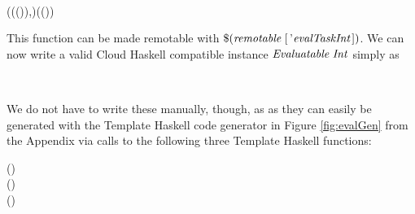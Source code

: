 \documentclass[paper=A4,twoside=true,openright,parskip=full,chapterprefix=true,headings=normal,bibliography=totoc,listof=totoc,titlepage=on,captions=tableabove,draft=false,british]{scrreprt}%
\begin{document}
\begin{hscode}\SaveRestoreHook
{}%
%
%
\>[B]{}\mathbin{::}{}\<[E]%
\\
\>[B]{}\<[5]%
\>[5]{}(\;(\;(\;)),\;)\to {}\;(\;()){}\<[E]%
\ColumnHook
\end{hscode}\resethooks
\vspace{-2\baselineskip}

This function can be made remotable with
\ensuremath{\mathbin{\$}(\Varid{remotable}\;[\mskip1.5mu }'\ensuremath{\Varid{evalTaskInt}\mskip1.5mu])}. We can now write a valid Cloud Haskell
compatible instance \ensuremath{\Conid{Evaluatable}\;\Conid{Int}} simply as


\begin{hscode}\SaveRestoreHook
{}%
%
%
\>[B]{}\;\;\;\<[E]%
\\
\>[B]{}\<[5]%
\>[5]{}\mathrel{=}\<[E]%
\ColumnHook
\end{hscode}\resethooks
\vspace{-2\baselineskip}

We do not have to write these manually, though, as as they can easily be
generated with the Template Haskell code generator in Figure
\ref{fig:evalGen} from the Appendix via calls to the following three
Template Haskell functions:


\begin{hscode}\SaveRestoreHook
{}%
%
\>[B]{}\mathbin{\$}(){}\<[E]%
\\
\>[B]{}\mathbin{\$}(){}\<[E]%
\\
\>[B]{}\mathbin{\$}(){}\<[E]%
\ColumnHook
\end{hscode}\resethooks
\vspace{-2\baselineskip}
\end{document}
